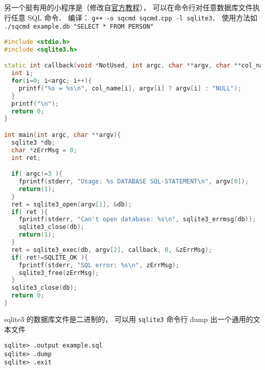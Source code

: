 另一个挺有用的小程序是（修改自\href{https://www.sqlite.org/quickstart.html}{官方教程}）， 可以在命令行对任意数据库文件执行任意 SQL 命令． 编译： \verb|g++ -o sqcmd sqcmd.cpp -l sqlite3|． 使用方法如 \verb|./sqcmd example.db "SELECT * FROM PERSON"|
\begin{lstlisting}[language=cpp]
#include <stdio.h>
#include <sqlite3.h>

static int callback(void *NotUsed, int argc, char **argv, char **col_name){
  int i;
  for(i=0; i<argc; i++){
    printf("%s = %s\n", col_name[i], argv[i] ? argv[i] : "NULL");
  }
  printf("\n");
  return 0;
}

int main(int argc, char **argv){
  sqlite3 *db;
  char *zErrMsg = 0;
  int ret;

  if( argc!=3 ){
    fprintf(stderr, "Usage: %s DATABASE SQL-STATEMENT\n", argv[0]);
    return(1);
  }
  ret = sqlite3_open(argv[1], &db);
  if( ret ){
    fprintf(stderr, "Can't open database: %s\n", sqlite3_errmsg(db));
    sqlite3_close(db);
    return(1);
  }
  ret = sqlite3_exec(db, argv[2], callback, 0, &zErrMsg);
  if( ret!=SQLITE_OK ){
    fprintf(stderr, "SQL error: %s\n", zErrMsg);
    sqlite3_free(zErrMsg);
  }
  sqlite3_close(db);
  return 0;
}
\end{lstlisting}

sqlite3 的数据库文件是二进制的， 可以用 \verb|sqlite3| 命令行 dump 出一个通用的文本文件
\begin{lstlisting}
sqlite> .output example.sql
sqlite> .dump
sqlite> .exit
\end{lstlisting}

